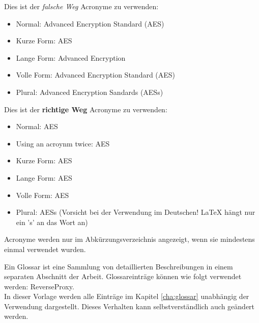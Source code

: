 Dies ist der \textit{falsche Weg} Acronyme zu verwenden:
\begin{itemize}
    \item Normal: Advanced Encryption Standard (AES)
    \item Kurze Form: AES
    \item Lange Form: Advanced Encryption
    \item Volle Form: Advanced Encryption Standard (AES)
    \item Plural: Advanced Encryption Sandards (AESs)
\end{itemize}

Dies ist der \textbf{richtige Weg} Acronyme zu verwenden:
\begin{itemize}
    \item Normal: \ac{AES}
    \item Using an acroynm twice: \ac{AES}
    \item Kurze Form: \acs{AES}
    \item Lange Form: \acl{AES}
    \item Volle Form: \acf{AES}
    \item Plural: \acfp{AES} (Vorsicht bei der Verwendung im Deutschen! LaTeX hängt nur ein 's' an das Wort an)
\end{itemize}

Acronyme werden nur im Abkürzungsverzeichnis angezeigt, wenn sie mindestens einmal verwendet wurden.

Ein Glossar ist eine Sammlung von detaillierten Beschreibungen in einem separaten Abschnitt der Arbeit. Glossareinträge können wie folgt verwendet werden: \gls{ReverseProxy}. \\
In dieser Vorlage werden alle Einträge im Kapitel \ref{cha:glossar} unabhängig der Verwendung dargestellt. Dieses Verhalten kann selbstverständlich auch geändert werden.
